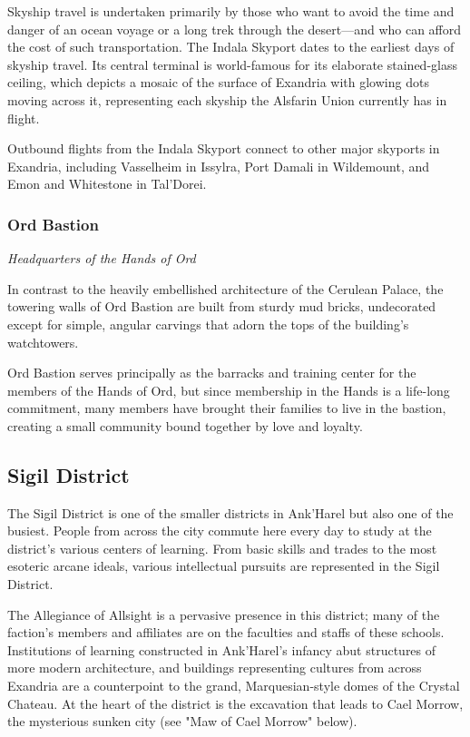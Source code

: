 \documentclass[letterpaper, 11pt, bg=full, twocolumn]{dndbook}
\begin{document}
Skyship travel is undertaken primarily by those who want to avoid the time and danger of an ocean voyage or a long trek through the desert---and who can afford the cost of such transportation. The Indala Skyport dates to the earliest days of skyship travel. Its central terminal is world-famous for its elaborate stained-glass ceiling, which depicts a mosaic of the surface of Exandria with glowing dots moving across it, representing each skyship the Alsfarin Union currently has in flight.

Outbound flights from the Indala Skyport connect to other major skyports in Exandria, including Vasselheim in Issylra, Port Damali in Wildemount, and Emon and Whitestone in Tal'Dorei.

\subsubsection{Ord Bastion}

\textit{Headquarters of the Hands of Ord}

In contrast to the heavily embellished architecture of the Cerulean Palace, the towering walls of Ord Bastion are built from sturdy mud bricks, undecorated except for simple, angular carvings that adorn the tops of the building's watchtowers.

Ord Bastion serves principally as the barracks and training center for the members of the Hands of Ord, but since membership in the Hands is a life-long commitment, many members have brought their families to live in the bastion, creating a small community bound together by love and loyalty.

\subsection{Sigil District}

The Sigil District is one of the smaller districts in Ank'Harel but also one of the busiest. People from across the city commute here every day to study at the district's various centers of learning. From basic skills and trades to the most esoteric arcane ideals, various intellectual pursuits are represented in the Sigil District.


The Allegiance of Allsight is a pervasive presence in this district; many of the faction's members and affiliates are on the faculties and staffs of these schools. Institutions of learning constructed in Ank'Harel's infancy abut structures of more modern architecture, and buildings representing cultures from across Exandria are a counterpoint to the grand, Marquesian-style domes of the Crystal Chateau. At the heart of the district is the excavation that leads to Cael Morrow, the mysterious sunken city (see "Maw of Cael Morrow" below).
\end{document}
